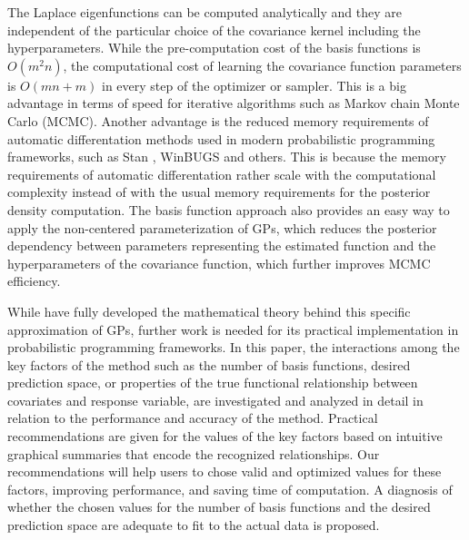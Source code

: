 \documentclass[onecolumn,a4paper,11pt]{article}
\begin{document}
The Laplace eigenfunctions can be computed analytically and they are independent of the particular choice of the covariance kernel including the hyperparameters. While the pre-computation cost of the basis functions is $O(m^2n)$, the computational cost of learning the covariance function parameters is $O(mn+m)$ in every step of the optimizer or sampler. This is a big advantage in terms of speed for iterative algorithms such as Markov chain Monte Carlo (MCMC). Another advantage is the reduced memory requirements of automatic differentation methods used in modern probabilistic programming frameworks, such as Stan \citep{carpenter2017stan}, WinBUGS \citep{lunn2000winbugs} and others. This is because the memory requirements of automatic differentation rather scale with the computational complexity instead of with the usual memory requirements for the posterior density computation. The basis function approach also provides an easy way to apply the non-centered parameterization of GPs, which reduces the posterior dependency between parameters representing the estimated function and the hyperparameters of the covariance function, which further improves MCMC efficiency.


While \citet{solin2018hilbert} have fully developed the mathematical theory behind this specific approximation of GPs, further work is needed for its practical implementation in probabilistic programming frameworks. In this paper, the interactions among the key factors of the method such as the number of basis functions, desired prediction space, or properties of the true functional relationship between covariates and response variable, are investigated and analyzed in detail in relation to the performance and accuracy of the method. Practical recommendations are given for the values of the key factors based on intuitive graphical summaries that encode the recognized relationships. Our recommendations will help users to chose valid and optimized values for these factors, improving performance, and saving time of computation. A diagnosis of whether the chosen values for the number of basis functions and the desired prediction space are adequate to fit to the actual data is proposed.
\end{document}
